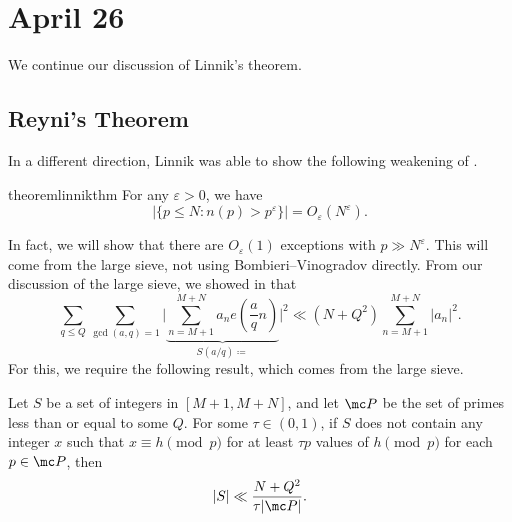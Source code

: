 \documentclass[../notes.tex]{subfiles}
\begin{document}
\section{April 26}

We continue our discussion of Linnik's theorem.

\subsection{Reyni's Theorem}
In a different direction, Linnik was able to show the following weakening of .
\begin{restatable}{theorem}{linnikthm} \label{thm:linnik}
	For any $\varepsilon>0$, we have
	\[\left|\{p\le N:n(p)>p^\varepsilon\}\right|=O_\varepsilon\left(N^\varepsilon\right).\]
\end{restatable}
In fact, we will show that there are $O_\varepsilon(1)$ exceptions with $p\gg N^\varepsilon$. This will come from the large sieve, not using Bombieri--Vinogradov directly. From our discussion of the large sieve, we showed in  that
\[\sum_{q\le Q}\sum_{\gcd(a,q)=1}\Bigg|\underbrace{\sum_{n=M+1}^{M+N}a_ne\left(\frac aqn\right)}_{S(a/q)\coloneqq}\Bigg|^2\ll\left(N+Q^2\right)\sum_{n=M+1}^{M+N}|a_n|^2.\]
For this, we require the following result, which comes from the large sieve.
\begin{theorem}[Reyni] \label{thm:reyni}
	Let $S$ be a set of integers in $[M+1,M+N]$, and let $\mc P$ be the set of primes less than or equal to some $Q$. For some $\tau\in(0,1)$, if $S$ does not contain any integer $x$ such that $x\equiv h\pmod p$ for at least $\tau p$ values of $h\pmod p$ for each $p\in\mc P$, then
	\[|S|\ll\frac{N+Q^2}{\tau|\mc P|}.\]
\end{theorem}
\end{document}
